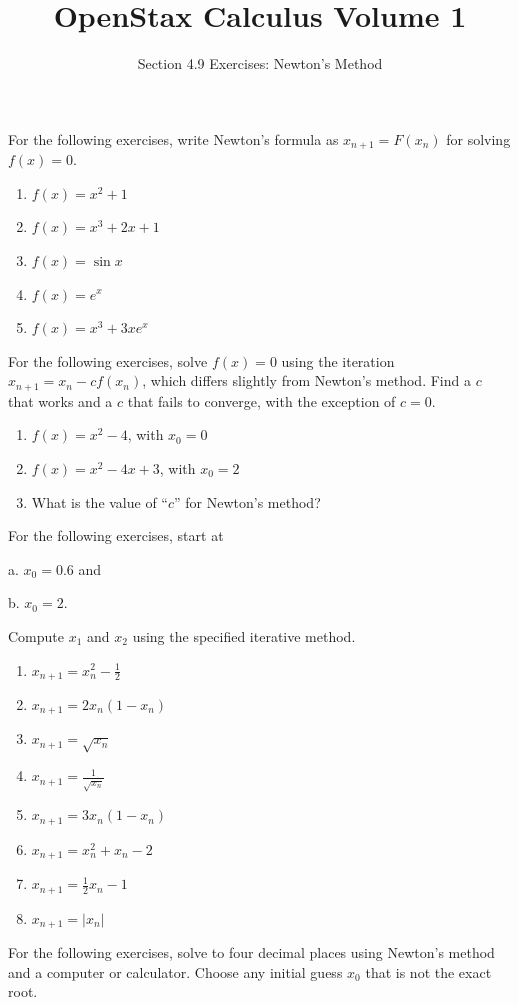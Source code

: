 \documentclass{exercises}
\title{OpenStax Calculus Volume 1}
\subtitle{Section 4.9 Exercises: Newton’s Method}
\author{}
\date{}
\begin{document}
\maketitle


For the following exercises, write Newton's formula as $x_{n+1}=F(x_{n})$ for solving $f(x)=0$.

\begin{enumerate}[start=1]
\item $f(x)=x^{2}+1$
\item $f(x)=x^{3}+2x+1$
\item $f(x)=\sin x$
\item $f(x)=e^{x}$
\item $f(x)=x^{3}+3xe^{x}$
\end{enumerate}

For the following exercises, solve $f(x)=0$ using the iteration $x_{n+1}=x_{n}-cf(x_{n})$, which differs slightly from Newton's method. Find a $c$ that works and a $c$ that fails to converge, with the exception of $c=0$.

\begin{enumerate}[resume]
\item $f(x)=x^{2}-4$, with $x_{0}=0$
\item $f(x)=x^{2}-4x+3$, with $x_{0}=2$
\item What is the value of ``$c$'' for Newton's method?
\end{enumerate}

For the following exercises, start at


a. $x_{0}=0.6$ and


b. $x_{0}=2$.


Compute $x_{1}$ and $x_{2}$ using the specified iterative method.

\begin{enumerate}[resume]
\item $x_{n+1}=x_{n}^{2}-\frac{1}{2}$
\item $x_{n+1}=2x_{n}(1-x_{n})$
\item $x_{n+1}=\sqrt{x_{n}}$
\item $x_{n+1}=\frac{1}{\sqrt{x_{n}}}$
\item $x_{n+1}=3x_{n}(1-x_{n})$
\item $x_{n+1}=x_{n}^{2}+x_{n}-2$
\item $x_{n+1}=\frac{1}{2}x_{n}-1$
\item $x_{n+1}=|x_{n}|$
\end{enumerate}

For the following exercises, solve to four decimal places using Newton's method and a computer or calculator. Choose any initial guess $x_{0}$ that is not the exact root.
\end{document}
